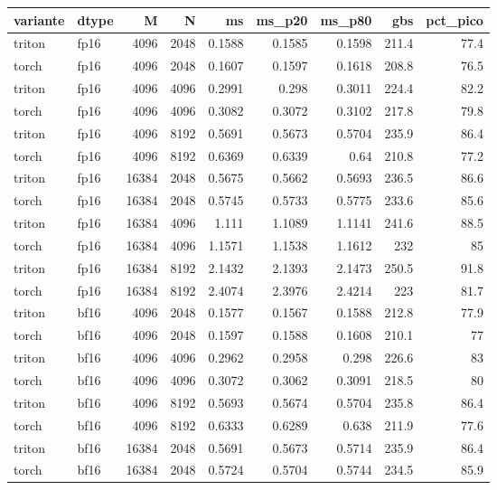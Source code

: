 \begin{table}[htbp]
  \centering\small
  \begin{tabular}{llrrrrrrr}
    \toprule
    variante & dtype & M & N & ms & ms\_p20 & ms\_p80 & gbs & pct\_pico \\
    \midrule
    triton & fp16 & 4096 & 2048 & 0.1588 & 0.1585 & 0.1598 & 211.4 & 77.4 \\
    torch & fp16 & 4096 & 2048 & 0.1607 & 0.1597 & 0.1618 & 208.8 & 76.5 \\
    triton & fp16 & 4096 & 4096 & 0.2991 & 0.298 & 0.3011 & 224.4 & 82.2 \\
    torch & fp16 & 4096 & 4096 & 0.3082 & 0.3072 & 0.3102 & 217.8 & 79.8 \\
    triton & fp16 & 4096 & 8192 & 0.5691 & 0.5673 & 0.5704 & 235.9 & 86.4 \\
    torch & fp16 & 4096 & 8192 & 0.6369 & 0.6339 & 0.64 & 210.8 & 77.2 \\
    triton & fp16 & 16384 & 2048 & 0.5675 & 0.5662 & 0.5693 & 236.5 & 86.6 \\
    torch & fp16 & 16384 & 2048 & 0.5745 & 0.5733 & 0.5775 & 233.6 & 85.6 \\
    triton & fp16 & 16384 & 4096 & 1.111 & 1.1089 & 1.1141 & 241.6 & 88.5 \\
    torch & fp16 & 16384 & 4096 & 1.1571 & 1.1538 & 1.1612 & 232 & 85 \\
    triton & fp16 & 16384 & 8192 & 2.1432 & 2.1393 & 2.1473 & 250.5 & 91.8 \\
    torch & fp16 & 16384 & 8192 & 2.4074 & 2.3976 & 2.4214 & 223 & 81.7 \\
    triton & bf16 & 4096 & 2048 & 0.1577 & 0.1567 & 0.1588 & 212.8 & 77.9 \\
    torch & bf16 & 4096 & 2048 & 0.1597 & 0.1588 & 0.1608 & 210.1 & 77 \\
    triton & bf16 & 4096 & 4096 & 0.2962 & 0.2958 & 0.298 & 226.6 & 83 \\
    torch & bf16 & 4096 & 4096 & 0.3072 & 0.3062 & 0.3091 & 218.5 & 80 \\
    triton & bf16 & 4096 & 8192 & 0.5693 & 0.5674 & 0.5704 & 235.8 & 86.4 \\
    torch & bf16 & 4096 & 8192 & 0.6333 & 0.6289 & 0.638 & 211.9 & 77.6 \\
    triton & bf16 & 16384 & 2048 & 0.5691 & 0.5673 & 0.5714 & 235.9 & 86.4 \\
    torch & bf16 & 16384 & 2048 & 0.5724 & 0.5704 & 0.5744 & 234.5 & 85.9 \\

\end{tabular}
\end{table}
